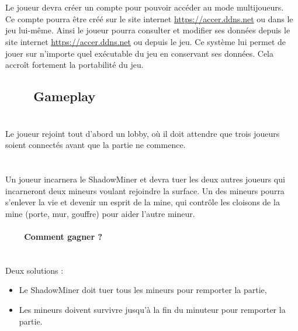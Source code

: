 \documentclass[titlepage, 13px, a4paper]{report}
\begin{document}
\paragraph{} \hspace{0pt} \\
Le joueur devra créer un compte pour pouvoir accéder au mode multijoueurs. \\
Ce compte pourra être créé sur le site internet \url{https://accer.ddns.net} ou dans le jeu lui-même. Ainsi le joueur pourra 
consulter et modifier ses données depuis le site internet \url{https://accer.ddns.net} ou depuis le jeu. Ce système lui permet 
de jouer sur n’importe quel exécutable du jeu en conservant ses données. 
Cela accroît fortement la portabilité du jeu. \\

\subsection[Gameplay]{~~~~Gameplay}
\paragraph{} \hspace{0pt} \\
Le joueur rejoint tout d’abord un lobby, où il doit attendre que trois joueurs 
soient connectés avant que la partie ne commence.

\paragraph{} \hspace{0pt} \\
Un joueur incarnera le ShadowMiner et devra tuer les deux autres joueurs qui 
incarneront deux mineurs voulant rejoindre la surface. Un des mineurs pourra 
s’enlever la vie et devenir un esprit de la mine, qui contrôle les cloisons de 
la mine (porte, mur, gouffre) pour aider l’autre mineur. \\

\paragraph{~~~~Comment gagner ?} \hspace{0pt} \\
Deux solutions : \\
{\begin{itemize}
	\item Le ShadowMiner doit tuer tous les mineurs pour remporter la partie,
	\item Les mineurs doivent survivre jusqu’à la fin du minuteur pour remporter la partie. \\
\end{itemize}}
\end{document}
